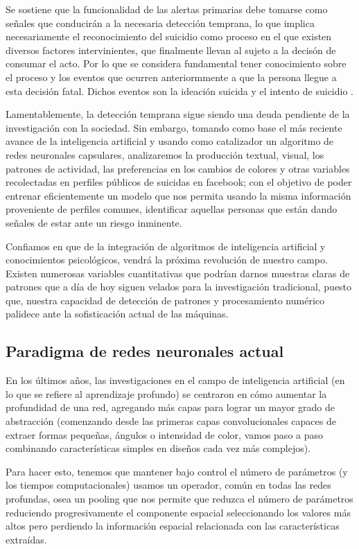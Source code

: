 \documentclass[12pt, donotrepeattitle, jou]{apa6}
\begin{document}
    Se sostiene que la funcionalidad de las alertas primarias debe tomarse como señales que conducirán a la necesaria detección temprana, lo que implica necesariamente el reconocimiento del suicidio como proceso en el que existen diversos factores intervinientes, que finalmente llevan al sujeto a la decisón de consumar el acto. Por lo que se considera fundamental tener conocimiento sobre el proceso y los eventos que ocurren anteriormmente a que la persona llegue a esta decisión fatal. Dichos eventos son la ideación suicida y el intento de suicidio \parencite{SANCHEZ2010}.
    
    Lamentablemente, la detección temprana sigue siendo una deuda pendiente de la investigación con la sociedad. Sin embargo, tomando como base el más reciente avance de la inteligencia artificial y usando como catalizador un algoritmo de redes neuronales capsulares, analizaremos la producción textual, visual, los patrones de actividad, las preferencias en los cambios de colores y otras variables recolectadas en perfiles públicos de suicidas en facebook; con el objetivo de poder entrenar eficientemente un modelo que nos permita usando la misma información proveniente de perfiles comunes, identificar aquellas personas que están dando señales de estar ante un riesgo inminente.
    
    Confiamos en que de la integración de algoritmos de inteligencia artificial y conocimientos psicológicos, vendrá la próxima revolución de nuestro campo. Existen numerosas variables cuantitativas que podrían darnos muestras claras de patrones que a día de hoy siguen velados para la investigación tradicional, puesto que, nuestra capacidad de detección de patrones y procesamiento numérico palidece ante la sofisticación actual de las máquinas.

    \subsection{Paradigma de redes neuronales actual}
    En los últimos años, las investigaciones en el campo de inteligencia artificial (en lo que se refiere al aprendizaje profundo) se centraron en cómo aumentar la profundidad de una red, agregando más capas para lograr un mayor grado de abstracción (comenzando desde las primeras capas convolucionales capaces de extraer formas pequeñas, ángulos o intensidad de color, vamos paso a paso combinando características simples en diseños cada vez más complejos)\parencite{Capsules}.
    
    Para hacer esto, tenemos que mantener bajo control el número de parámetros (y los tiempos computacionales) usamos un operador, común en todas las redes profundas, osea un pooling que nos permite que reduzca el número de parámetros reduciendo progresivamente el componente espacial seleccionando los valores más altos pero perdiendo la información espacial relacionada con las características extraídas\parencite{Capsules2}.
    
\end{document}
